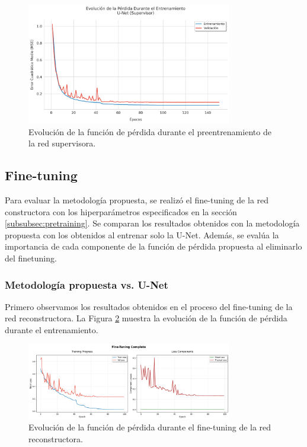 \begin{figure}[H]
    \centering
    \includegraphics[width=0.8\textwidth]{Images/perdidas_entrenamiento_super.png}
    \caption{Evolución de la función de pérdida durante el preentrenamiento de la red supervisora.}
    \label{fig:supervisor_pretraining}
\end{figure}

\subsection{Fine-tuning}

Para evaluar la metodología propuesta, se realizó el fine-tuning de la red constructora con los hiperparámetros especificados en la sección \ref{subsubsec:pretraining}. Se comparan los resultados obtenidos con la metodología propuesta con los obtenidos al entrenar solo la U-Net. Además, se evalúa la importancia de cada componente de la función de pérdida propuesta al eliminarlo del finetuning.

\subsubsection{Metodología propuesta vs. U-Net}

Primero observamos los resultados obtenidos en el proceso del fine-tuning de la red reconstructora. La Figura \ref{fig:reconstructor_finetuning} muestra la evolución de la función de pérdida durante el entrenamiento. 

\begin{figure}[H]
    \centering
    \includegraphics[width=0.8\textwidth]{Images/perdidas_entrenamiento_finetuning.png}
    \caption{Evolución de la función de pérdida durante el fine-tuning de la red reconstructora.}
    \label{fig:reconstructor_finetuning}
\end{figure}

